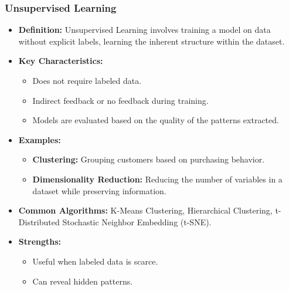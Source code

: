 \documentclass[aspectratio=169]{beamer}
\begin{document}
\begin{frame}[fragile]
    \frametitle{Unsupervised Learning}
    \begin{itemize}
        \item \textbf{Definition:} 
        Unsupervised Learning involves training a model on data without explicit labels, learning the inherent structure within the dataset.
        
        \item \textbf{Key Characteristics:}
        \begin{itemize}
            \item Does not require labeled data.
            \item Indirect feedback or no feedback during training.
            \item Models are evaluated based on the quality of the patterns extracted.
        \end{itemize}
        
        \item \textbf{Examples:}
        \begin{itemize}
            \item \textbf{Clustering:} Grouping customers based on purchasing behavior.
            \item \textbf{Dimensionality Reduction:} Reducing the number of variables in a dataset while preserving information.
        \end{itemize}
        
        \item \textbf{Common Algorithms:} K-Means Clustering, Hierarchical Clustering, t-Distributed Stochastic Neighbor Embedding (t-SNE).
        
        \item \textbf{Strengths:}
        \begin{itemize}
            \item Useful when labeled data is scarce.
            \item Can reveal hidden patterns.
        \end{itemize}
    \end{itemize}
\end{frame}
\end{document}
